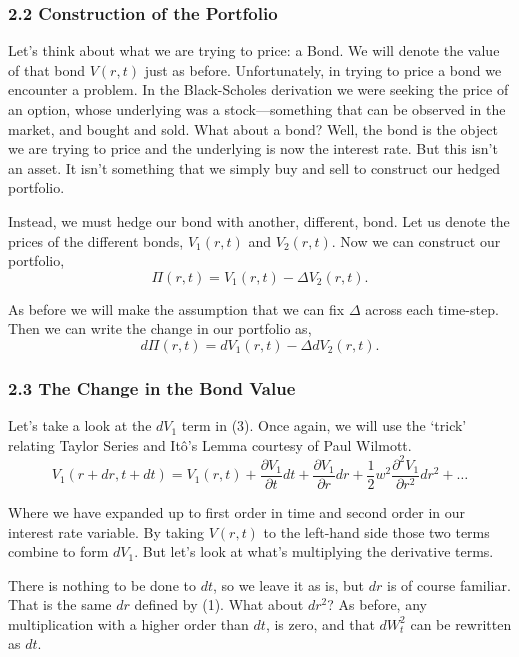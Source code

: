 \documentclass[11pt]{article}
\begin{document}
\subsubsection*{2.2 Construction of the Portfolio}
Let's think about what we are trying to price: a Bond. We will denote the value of that bond $V(r,t)$ just as before. Unfortunately, in trying to price a bond we encounter a problem. In the Black-Scholes derivation we were seeking the price of an option, whose underlying was a stock––something that can be observed in the market, and bought and sold. What about a bond? Well, the bond is the object we are trying to price and the underlying is now the interest rate. But this isn't an asset. It isn't something that we simply buy and sell to construct our hedged portfolio.

Instead, we must hedge our bond with another, different, bond. Let us denote the prices of the different bonds, $V_{1}(r,t)$ and $V_{2}(r,t)$. Now we can construct our portfolio,
\begin{equation}
    \Pi(r,t) =  V_{1}(r,t) - \Delta V_{2}(r,t). 
\end{equation}

As before we will make the assumption that we can fix $\Delta$ across each time-step. Then we can write the change in our portfolio as,
\begin{equation}
    d\Pi(r,t) =  dV_{1}(r,t) -  \Delta dV_{2}(r,t). 
\end{equation}

\subsubsection*{2.3 The Change in the Bond Value}
Let's take a look at the $dV_1$ term in (3). Once again, we will use the `trick' relating Taylor Series and Itô's Lemma courtesy of Paul Wilmott.
\begin{equation}
    V_{1}(r+dr, t+dt) = V_{1}(r,t) + \frac{\partial V_{1}}{\partial t} dt + \frac{\partial V_{1}}{\partial r} dr + \frac{1}{2} w^2 \frac{\partial^2 V_{1}}{\partial r^2} dr^2 + \ldots
\end{equation}

Where we have expanded up to first order in time and second order in our interest rate variable. By taking $V(r,t)$ to the left-hand side those two terms combine to form $dV_{1}$. But let's look at what's multiplying the derivative terms.

There is nothing to be done to $dt$, so we leave it as is, but $dr$ is of course familiar. That is the same $dr$ defined by (1). What about $dr^2$? As before, any multiplication with a higher order than $dt$, is zero, and that $dW_{t}^{2}$ can be rewritten as $dt$.
\end{document}
